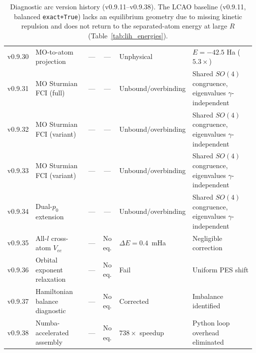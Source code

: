 \documentclass[aps,pra,twocolumn,superscriptaddress,longbibliography]{revtex4-2}
\begin{document}
\begin{table}[t]
\begin{tabular}{llccll}
v0.9.30 & MO-to-atom projection
  & --- & --- & Unphysical & $E=-42.5$ Ha ($5.3\times$) \\
v0.9.31 & MO Sturmian FCI (full)
  & --- & --- & Unbound/overbinding & Shared $SO(4)$ congruence, eigenvalues $\gamma$-independent \\
v0.9.32 & MO Sturmian FCI (variant)
  & --- & --- & Unbound/overbinding & Shared $SO(4)$ congruence, eigenvalues $\gamma$-independent \\
v0.9.33 & MO Sturmian FCI (variant)
  & --- & --- & Unbound/overbinding & Shared $SO(4)$ congruence, eigenvalues $\gamma$-independent \\
v0.9.34 & Dual-$p_0$ extension
  & --- & --- & Unbound/overbinding & Shared $SO(4)$ congruence, eigenvalues $\gamma$-independent \\
v0.9.35 & All-$l$ cross-atom $V_{ee}$
  & --- & No eq. & $\Delta E = 0.4$~mHa & Negligible correction \\
v0.9.36 & Orbital exponent relaxation
  & --- & No eq. & Fail & Uniform PES shift \\
v0.9.37 & Hamiltonian balance diagnostic
  & --- & No eq. & Corrected & Imbalance identified \\
v0.9.38 & Numba-accelerated assembly
  & --- & No eq. & $738\times$ speedup & Python loop overhead eliminated \\
\bottomrule
\end{tabular}
\caption{Diagnostic arc version history (v0.9.11--v0.9.38).
The LCAO baseline (v0.9.11, balanced \texttt{exact+True}) lacks an
equilibrium geometry due to missing kinetic repulsion and does not
return to the separated-atom energy at large $R$
(Table~\ref{tab:lih_energies}).}
\label{tab:versions}
\end{table}

\end{document}
